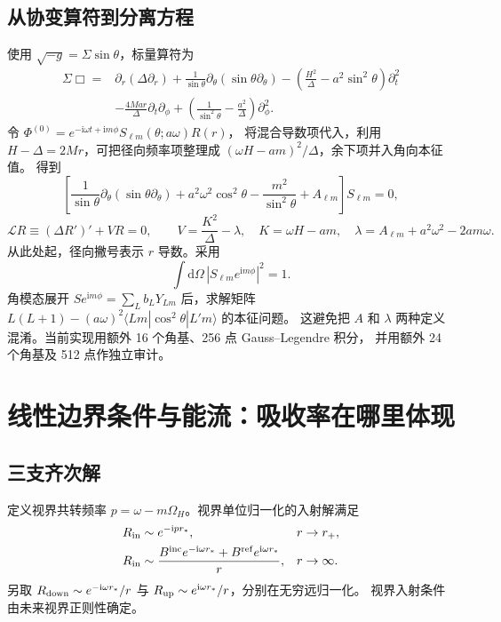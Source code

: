 \documentclass[UTF8,fontset=fandol,11pt,a4paper]{ctexart}
\newcommand{\ii}{\mathrm{i}}
\newcommand{\dd}{\mathrm{d}}
\newcommand{\Bin}{B^{\mathrm{inc}}}
\newcommand{\Bref}{B^{\mathrm{ref}}}
\numberwithin{equation}{section}
\begin{document}
\subsection{从协变算符到分离方程}
使用 $\sqrt{-g}=\Sigma\sin\theta$，标量算符为
\begin{align}
\Sigma\Box={}&\partial_r(\Delta\partial_r)
+\frac1{\sin\theta}\partial_\theta(\sin\theta\partial_\theta)
-\left(\frac{H^2}{\Delta}-a^2\sin^2\theta\right)\partial_t^2\nonumber\\
&-\frac{4Mar}{\Delta}\partial_t\partial_\phi
+\left(\frac1{\sin^2\theta}-\frac{a^2}{\Delta}\right)\partial_\phi^2.
\end{align}
令 $\Phi^{(0)}=e^{-\ii\omega t+\ii m\phi}S_{\ell m}(\theta;a\omega)R(r)$，
将混合导数项代入，利用 $H-\Delta=2Mr$，可把径向频率项整理成
$(\omega H-am)^2/\Delta$，余下项并入角向本征值。
得到\cite{Teukolsky1973}
\begin{equation}
\left[\frac1{\sin\theta}\partial_\theta(\sin\theta\partial_\theta)
+a^2\omega^2\cos^2\theta-\frac{m^2}{\sin^2\theta}+A_{\ell m}\right]S_{\ell m}=0,
\end{equation}
\begin{equation}
\mathcal L R\equiv(\Delta R')'+VR=0,\qquad
V=\frac{K^2}{\Delta}-\lambda,\quad K=\omega H-am,
\quad\lambda=A_{\ell m}+a^2\omega^2-2am\omega.\label{radial}
\end{equation}
从此处起，径向撇号表示 $r$ 导数。采用
\begin{equation}\int\dd\Omega\,|S_{\ell m}e^{\ii m\phi}|^2=1.\end{equation}
角模态展开 $S e^{\ii m\phi}=\sum_L b_L Y_{Lm}$ 后，求解矩阵
$L(L+1)-(a\omega)^2\langle Lm|\cos^2\theta|L'm\rangle$ 的本征问题。
这避免把 $A$ 和 $\lambda$ 两种定义混淆。当前实现用额外 16 个角基、256 点 Gauss--Legendre 积分，
并用额外 24 个角基及 512 点作独立审计。

\section{线性边界条件与能流：吸收率在哪里体现}
\subsection{三支齐次解}
定义视界共转频率 $p=\omega-m\Omega_H$。视界单位归一化的入射解满足
\begin{align}
R_{\rm in}&\sim e^{-\ii p r_*},&&r\to r_+,\\
R_{\rm in}&\sim\frac{\Bin e^{-\ii\omega r_*}+\Bref e^{\ii\omega r_*}}r,
&&r\to\infty.
\end{align}
另取 $R_{\rm down}\sim e^{-\ii\omega r_*}/r$ 与
$R_{\rm up}\sim e^{\ii\omega r_*}/r$，分别在无穷远归一化。
视界入射条件由未来视界正则性确定。
\end{document}
